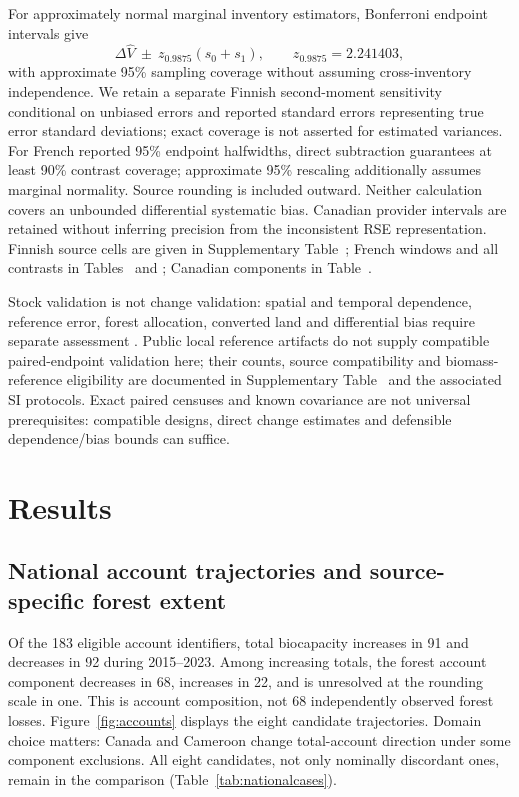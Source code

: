 \documentclass[11pt,a4paper]{article}
\begin{document}
For approximately normal marginal inventory estimators, Bonferroni endpoint intervals give
\begin{equation}
\Delta\widehat V\ \pm\ z_{0.9875}(s_0+s_1),\qquad z_{0.9875}=2.241403,\label{eq:invbonf}
\end{equation}
with approximate 95\% sampling coverage without assuming cross-inventory independence. We retain a separate Finnish second-moment sensitivity conditional on unbiased errors and reported standard errors representing true error standard deviations; exact coverage is not asserted for estimated variances. For French reported 95\% endpoint halfwidths, direct subtraction guarantees at least 90\% contrast coverage; approximate 95\% rescaling additionally assumes marginal normality. Source rounding is included outward. Neither calculation covers an unbounded differential systematic bias. Canadian provider intervals are retained without inferring precision from the inconsistent RSE representation. Finnish source cells are given in Supplementary Table~; French windows and all contrasts in Tables~ and ; Canadian components in Table~.

Stock validation is not change validation: spatial and temporal dependence, reference error, forest allocation, converted land and differential bias require separate assessment \citep{Olofsson2014,E3UB2025,PVIR2026}. Public local reference artifacts do not supply compatible paired-endpoint validation here; their counts, source compatibility and biomass-reference eligibility are documented in Supplementary Table~ and the associated SI protocols. Exact paired censuses and known covariance are not universal prerequisites: compatible designs, direct change estimates and defensible dependence/bias bounds can suffice.

\section{Results}
\subsection{National account trajectories and source-specific forest extent}\label{sec:nationalresults}
Of the 183 eligible account identifiers, total biocapacity increases in 91 and decreases in 92 during 2015--2023. Among increasing totals, the forest account component decreases in 68, increases in 22, and is unresolved at the rounding scale in one. This is account composition, not 68 independently observed forest losses. Figure~\ref{fig:accounts} displays the eight candidate trajectories. Domain choice matters: Canada and Cameroon change total-account direction under some component exclusions. All eight candidates, not only nominally discordant ones, remain in the comparison (Table~\ref{tab:nationalcases}).
\end{document}
